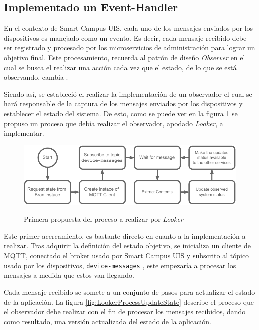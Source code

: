 
\subsection{Implementado un Event-Handler}

En el contexto de Smart Campus UIS, cada uno de los mensajes enviados por los dispositivos es manejado como un evento. Es decir, cada mensaje recibido debe ser registrado y procesado por los microservicios de administración para lograr un objetivo final. Este procesamiento, recuerda al patrón de diseño \textit{Observer} en el cual se busca el realizar una acción cada vez que el estado, de lo que se está observando, cambia \cite{Shvets2019}.

Siendo así, se estableció el realizar la implementación de un observador el cual se hará responsable de la captura de los mensajes enviados por los dispositivos y establecer el estado del sistema. De esto, como se puede ver en la figura \ref{fig:procesoLooker} se propuso un proceso que debía realizar el observador, apodado \textit{Looker}, a implementar.

\begin{figure}[ht]
    \caption{Primera propuesta del proceso a realizar por \textit{Looker}} 
    \centering
    \includegraphics[width=\linewidth]{images/LookerProcess.pdf}
    \label{fig:procesoLooker}
\end{figure} 

Este primer acercamiento, es bastante directo en cuanto a la implementación a realizar. Tras adquirir la definición del estado objetivo, se inicializa un cliente de MQTT, conectado el broker usado por Smart Campus UIS y subscrito al tópico usado por los dispositivos, \texttt{device-messages} \cite{SmartCampusGithub}, este empezaría a procesar los mensajes a medida que estos van llegando. 

Cada mensaje recibido se somete a un conjunto de pasos para actualizar el estado de la aplicación. La figura \ref{fig:LookerProcessUpdateState} describe el proceso que el observador debe realizar con el fin de procesar los mensajes recibidos, dando como resultado, una versión actualizada del estado de la aplicación. 

